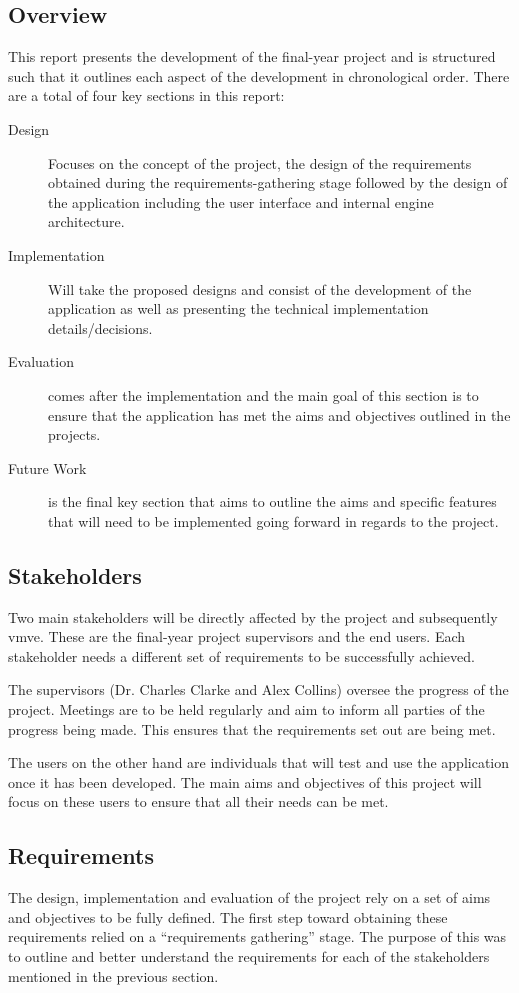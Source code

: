 \documentclass[11pt]{article}
\begin{document}
\subsection{Overview}
This report presents the development of the final-year project and is structured
such that it outlines each aspect of the development in chronological order.
There are a total of four key sections in this report:
\begin{description}
  \item[Design] Focuses on the concept of the project, the design of the
    requirements obtained during the requirements-gathering stage followed by
    the design of the application including the user interface and internal
    engine architecture.
  \item[Implementation] Will take the proposed designs and consist of the
    development of the application as well as presenting the technical
    implementation details/decisions.
  \item[Evaluation] comes after the implementation and the main goal of this
    section is to ensure that the application has met the aims and objectives
    outlined in the projects.
  \item[Future Work] is the final key section that aims to outline the aims and
    specific features that will need to be implemented going forward in regards
    to the project.
\end{description}

\subsection{Stakeholders}
Two main stakeholders will be directly affected by the project and subsequently
\gls*{vmve}. These are the final-year project supervisors and the end users. Each
stakeholder needs a different set of requirements to be successfully achieved.

The supervisors (Dr. Charles Clarke and Alex Collins) oversee the progress of
the project. Meetings are to be held regularly and aim to inform all parties of
the progress being made. This ensures that the requirements set out are being
met.

The users on the other hand are individuals that will test and use the
application once it has been developed. The main aims and objectives of this
project will focus on these users to ensure that all their needs can be met. 

\subsection{Requirements}
The design, implementation and evaluation of the project rely on a set of aims
and objectives to be fully defined. The first step toward obtaining these
requirements relied on a ``requirements gathering'' stage. The purpose of this
was to outline and better understand the requirements for each of the
stakeholders mentioned in the previous section.
\end{document}
